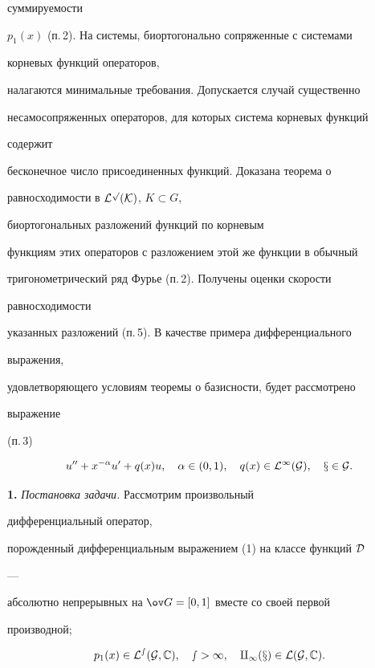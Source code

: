 суммируемости


$p_1(x)$ (п.\,2). На системы, биортогонально сопряженные с системами


корневых функций операторов,


налагаются минимальные требования. Допускается случай существенно


несамосопряженных операторов, для которых система корневых функций


содержит


бесконечное число присоединенных функций. Доказана теорема о


равносходимости в $\cal L^p(K)$, $K\subset G$,


биортогональных разложений функций по корневым


функциям этих операторов с разложением этой же функции в обычный


тригонометрический ряд Фурье (п.\,2). Получены оценки скорости


равносходимости


указанных разложений (п.\,5). В качестве примера дифференциального


выражения,


удовлетворяющего условиям теоремы о базисности, будет рассмотрено


выражение


(п.\,3)


\begin{equation}


u''+x^{-\alpha}u'+q(x)u,\quad \alpha\in(0,1),\quad


q(x)\in\cal L^1(G),\quad x\in G.


\end{equation}





{\bf 1.} {\it Постановка задачи.} Рассмотрим произвольный


дифференциальный оператор,


порожденный дифференциальным выражением (1) на классе функций $\cal D$


---


абсолютно непрерывных на $\ov G=[0,1]$ вместе со своей первой


производной;


\begin{equation}


p_1(x)\in\cal L^s(G,\Bbb C),\quad s>1,\quad


q_1(x)\in\cal L(G,\Bbb C).


\end{equation}





